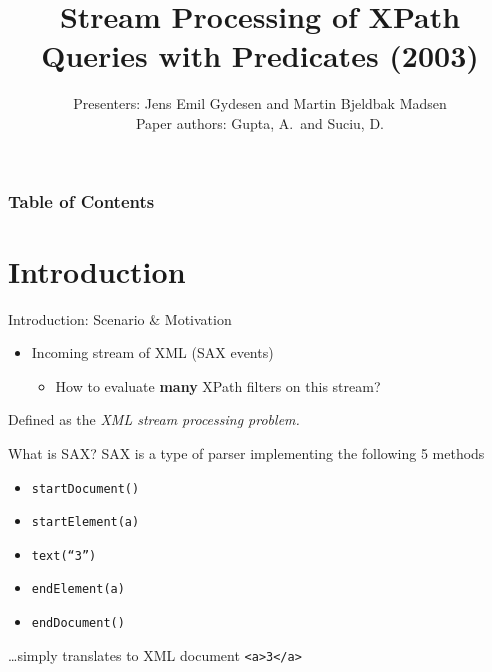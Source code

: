 \documentclass[mathserif,serif]{beamer}
\title{\large Stream Processing of XPath Queries with Predicates (2003)}
\author{Presenters: Jens Emil Gydesen and Martin Bjeldbak Madsen \\
        Paper authors: Gupta, A.\ and Suciu, D.}
\date{\DTMdisplaydate{2015}{6}{4}{3}}
\begin{document}
\frame{\titlepage}

\begin{frame}
  \frametitle{Table of Contents}
  \tableofcontents[hideallsubsections]
\end{frame}


\section{Introduction}
\begin{frame}{Introduction: Scenario \& Motivation}
  \begin{itemize}
    \item Incoming stream of XML (SAX events)
      \begin{itemize}
        \item How to evaluate \textbf{many} XPath filters on this stream?
      \end{itemize}
  \end{itemize}

  Defined as the \textit{XML stream processing problem.}


\end{frame}

\begin{frame}{What is SAX?}
  SAX is a type of parser implementing the following 5 methods
  \begin{itemize}
    \item[] \texttt{startDocument()}
    \item[] \quad\texttt{startElement(a)}
    \item[] \quad\quad\texttt{text(``3'')}
    \item[] \quad\texttt{endElement(a)}
    \item[] \texttt{endDocument()}
  \end{itemize}
  \dots simply translates to XML document \texttt{<a>3</a>}
\end{frame}
\end{document}
